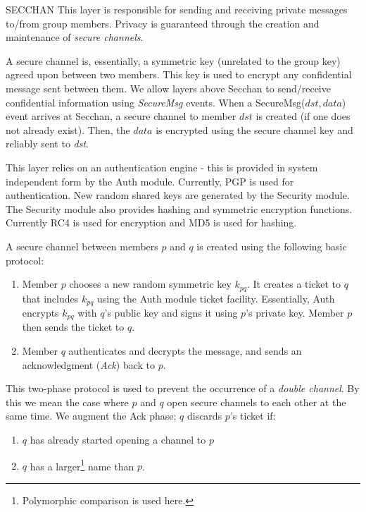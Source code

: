 %
%
%
\begin{Layer}{SECCHAN}
\label{layer:secchan}
This layer is responsible for sending and receiving private messages 
to/from group members. Privacy is guaranteed through the creation and
maintenance of {\it secure channels}. 

A secure channel is, essentially, a symmetric key (unrelated to the group key)
agreed upon between two members. This key is used to encrypt any
confidential message sent between them. We allow layers above 
Secchan to send/receive confidential information using
{\it SecureMsg} events. When a SecureMsg($dst,data$) event arrives at
Secchan, a secure channel to member $dst$ is created (if one does
not already exist). Then, the $data$ is encrypted using the secure channel key
and reliably sent to {\it dst}.

This layer relies on an authentication engine - this is provided in
system independent form by the Auth module. Currently, PGP is used for
authentication. New random shared keys are generated by the
Security module. The Security module also provides hashing and
symmetric encryption functions. Currently RC4 is used for encryption
and MD5 is used for hashing. 

\begin{Protocol}
A secure channel between members $p$ and $q$ is created using the
following basic protocol:
\begin{enumerate}
\item 
Member $p$ chooses a new random symmetric key $k_{pq}$.  It creates a
ticket to $q$ that includes $k_{pq}$ using the Auth module ticket
facility. Essentially, Auth encrypts $k_{pq}$ with $q$'s public key and
signs it using $p$'s private key. Member $p$ then sends the ticket to $q$.
\item 
Member $q$ authenticates and decrypts the message, and sends an
acknowledgment ({\it Ack}) back to $p$.
\end{enumerate}

This two-phase protocol is used to prevent the occurrence of a {\it
double channel}. By this we mean the case where $p$ and $q$ open
secure channels to each other at the same time. We augment the Ack phase;
$q$ discards $p$'s ticket if:
\begin{enumerate} 
\item $q$ has already started opening a channel to $p$
\item $q$ has a larger\footnote{Polymorphic comparison is used here.} name
than $p$.
\end{enumerate}


\end{Protocol}
\end{Layer}

